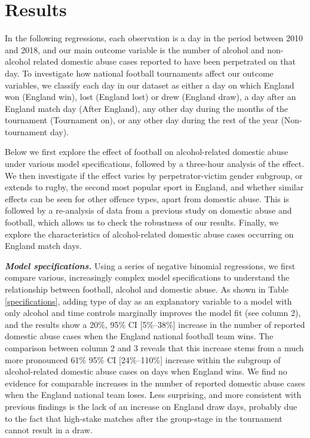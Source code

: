 \documentclass[12pt, a4paper]{article}
\begin{document}
\section*{Results}


In the following regressions, each observation is a day in the period between 2010 and 2018, and our main outcome variable is the number of alcohol and non-alcohol related domestic abuse cases reported to have been perpetrated on that day. To investigate how national football tournaments affect our outcome variables, we classify each day in our dataset as either a day on which England won (England win), lost (England lost) or drew (England draw), a day after an England match day (After England), any other day during the months of the tournament (Tournament on), or any other day during the rest of the year (Non-tournament day). 

Below we first explore the effect of football on alcohol-related domestic abuse under various model specifications, followed by a three-hour analysis of the effect. We then investigate if the effect varies by perpetrator-victim gender subgroup, or extends to rugby, the second most popular sport in England, and whether similar effects can be seen for other offence types, apart from domestic abuse. This is followed by a re-analysis of data from a previous study on domestic abuse and football, which allows us to check the robustness of our results. Finally, we explore the characteristics of alcohol-related domestic abuse cases occurring on England match days.

\textbf{\textit{Model specifications.}} Using a series of negative binomial regressions, we first compare various, increasingly complex model specifications to understand the relationship between football, alcohol and domestic abuse.  As shown in Table \ref{specifications}, adding type of day as an explanatory variable to a model with only alcohol and time controls marginally improves the model fit (see column 2), and the results show a 20\%, 95\% CI [5\%--38\%] increase in the number of reported domestic abuse cases when the England national football team wins. The comparison between column 2 and 3 reveals that this increase stems from a much more pronounced 61\% 95\% CI [24\%--110\%] increase within the subgroup of alcohol-related domestic abuse cases on days when England wins. We find no evidence for comparable increases in the number of reported domestic abuse cases when the England national team loses. Less surprising, and more consistent with previous findings is the lack of an increase on England draw days, probably due to the fact that high-stake matches after the group-stage in the tournament cannot result in a draw. 
\end{document}
